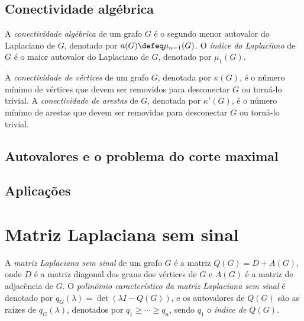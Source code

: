 \documentclass{article}
\begin{document}
\subsection{Conectividade algébrica}

\begin{defn}
    A \emph{conectividade algébrica} de um grafo \(G\) é o segundo menor autovalor do Laplaciano de \(G\), denotado por \(a(G) \defeq \mu_{n-1}(G)\). O \emph{índice do Laplaciano} de \(G\) é o maior autovalor do Laplaciano de \(G\), denotado por \(\mu_1(G)\).
\end{defn}

\begin{prop}

\end{prop}

\begin{cor}

\end{cor}

\begin{defn}
    A \emph{conectividade de vértices} de um grafo \(G\), denotada por \(\kappa(G)\), é o número mínimo de vértices que devem ser removidos para desconectar \(G\) ou torná-lo trivial. A \emph{conectividade de arestas} de \(G\), denotada por \(\kappa'(G)\), é o número mínimo de arestas que devem ser removidas para desconectar \(G\) ou torná-lo trivial.
\end{defn}

\subsection{Autovalores e o problema do corte maximal}



\subsection{Aplicações}

\section{Matriz Laplaciana sem sinal}

\begin{defn}
    A \emph{matriz Laplaciana sem sinal} de um grafo \(G\) é a matriz \(Q(G) = D + A(G)\), onde \(D\) é a matriz diagonal dos graus dos vértices de \(G\) e \(A(G)\) é a matriz de adjacência de \(G\).
    O \emph{polinômio característico da matriz Laplaciana sem sinal} é denotado por \(q_G(\lambda) = \det(\lambda I - Q(G))\), e os autovalores de \(Q(G)\) são as raízes de \(q_G(\lambda)\), denotados por \(q_1 \geq \cdots \geq q_n\), sendo \(q_1\) o \emph{índice de \(Q(G)\)}.
\end{defn}
\end{document}
